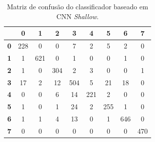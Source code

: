 \begin{table}[H]
	\centering
	\begin{tabular}{c||c|c|c|c|c|c|c|c|}
		\cline{2-9}
		& \textbf{0} & \textbf{1} & \textbf{2} & \textbf{3} & \textbf{4} & \textbf{5} & \textbf{6} & \textbf{7} \\ \hline \hline
		\multicolumn{1}{|c||}{\textbf{0}} & 228        & 0          & 0          & 7          & 2          & 5          & 2          & 0          \\ \hline
		\multicolumn{1}{|c||}{\textbf{1}} & 1          & 621        & 0          & 1          & 0          & 0          & 1          & 0          \\ \hline
		\multicolumn{1}{|c||}{\textbf{2}} & 1          & 0          & 304        & 2          & 3          & 0          & 0          & 1          \\ \hline
		\multicolumn{1}{|c||}{\textbf{3}} & 17         & 2          & 12         & 504        & 5          & 21         & 18         & 0          \\ \hline
		\multicolumn{1}{|c||}{\textbf{4}} & 0          & 0          & 6          & 14         & 221        & 2          & 0          & 0          \\ \hline
		\multicolumn{1}{|c||}{\textbf{5}} & 1          & 0          & 1          & 24         & 2          & 255        & 1          & 0          \\ \hline
		\multicolumn{1}{|c||}{\textbf{6}} & 1          & 1          & 4          & 13         & 0          & 1          & 646        & 0          \\ \hline
		\multicolumn{1}{|c||}{\textbf{7}} & 0          & 0          & 0          & 0          & 0          & 0          & 0          & 470        \\ \hline
	\end{tabular}
	\caption{Matriz de confusão do classificador baseado em CNN \textit{Shallow}.}
	\label{tab:mc_CNN_deep}
\end{table}


